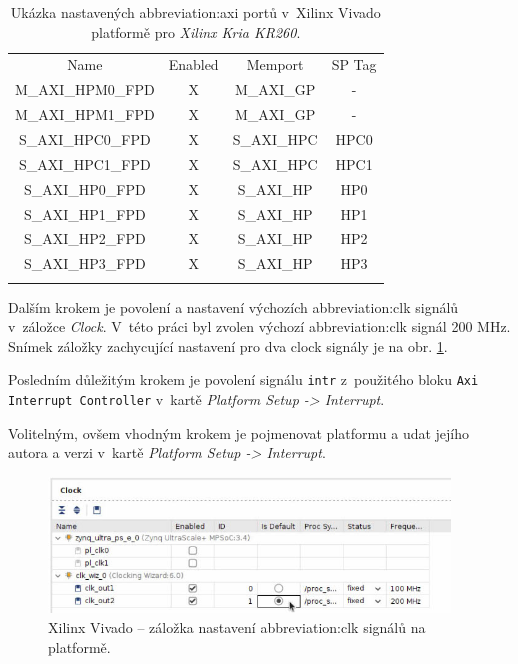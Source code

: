\documentclass[a4paper, twoside, 11pt]{article}
\begin{document}
				\begin{table}[H]
					\centering
					\caption{Ukázka nastavených \gls{abbreviation:axi} portů v~Xilinx Vivado platformě pro \textit{Xilinx Kria KR260}.}
				  \vspace*{0.15cm}
				
					\begin{tabular}{!{\vrule width 2pt} c | c | c | c !{\vrule width 2pt}}
					Name & Enabled & Memport & SP Tag\\
					M\_AXI\_HPM0\_FPD & X & M\_AXI\_GP & -\\ \hline
					M\_AXI\_HPM1\_FPD & X & M\_AXI\_GP & -\\ \hline
					S\_AXI\_HPC0\_FPD & X & S\_AXI\_HPC & HPC0\\ \hline
					S\_AXI\_HPC1\_FPD & X & S\_AXI\_HPC & HPC1\\ \hline
					S\_AXI\_HP0\_FPD & X & S\_AXI\_HP & HP0\\ \hline
					S\_AXI\_HP1\_FPD & X & S\_AXI\_HP & HP1\\ \hline
					S\_AXI\_HP2\_FPD & X & S\_AXI\_HP & HP2\\ \hline
					S\_AXI\_HP3\_FPD & X & S\_AXI\_HP & HP3\\ 
					\end{tabular}
					\label{tab:vivado-platform-setup-axi-xilinx-kria}
				\end{table}

				Dalším krokem je povolení a nastavení výchozích \gls{abbreviation:clk} signálů v~záložce \textit{Clock}. V~této práci byl zvolen výchozí \gls{abbreviation:clk} signál 200 MHz. Snímek záložky zachycující nastavení pro dva clock signály je na obr. \ref{fig:kr26-xilix-vivado-flow-14}.\par
				Posledním důležitým krokem je povolení signálu \texttt{intr} z~použitého bloku \texttt{Axi Interrupt Controller} v~kartě \textit{Platform Setup -> Interrupt}.\par
				Volitelným, ovšem vhodným krokem je pojmenovat platformu a udat jejího autora a verzi v~kartě \textit{Platform Setup -> Interrupt}.

				\begin{figure}[htbp!]
					\centering
					\includegraphics[width=0.95\textwidth]{src/png/kr26-xilinx-vivado-flow/kr26-xilix-vivado-flow-14.jpg}
					\caption{Xilinx Vivado – záložka nastavení \gls{abbreviation:clk} signálů na platformě.}
					\label{fig:kr26-xilix-vivado-flow-14}
				\end{figure}
\end{document}
